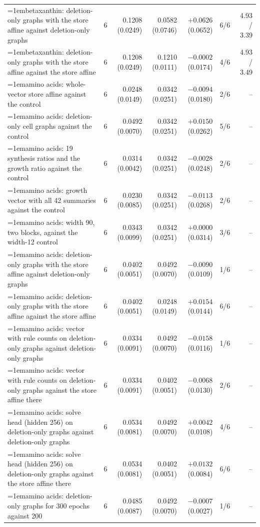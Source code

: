 \begin{table}[H]
\begin{tabular}{@{}>{\raggedright\hangindent=1em\hangafter=1\arraybackslash}p{78.5mm}rrrrrr@{}}
    betaxanthin: deletion-only graphs with the store affine against deletion-only graphs & 6 & 0.1208 (0.0249) & 0.0582 (0.0746) & $+0.0626$ (0.0652) & 6/6 & 4.93 / 3.39 \\
    betaxanthin: deletion-only graphs with the store affine against the store affine & 6 & 0.1208 (0.0249) & 0.1210 (0.0111) & $-0.0002$ (0.0174) & 4/6 & 4.93 / 3.49 \\
    amino acids: whole-vector store affine against the control & 6 & 0.0248 (0.0149) & 0.0342 (0.0251) & $-0.0094$ (0.0180) & 2/6 & -- \\
    amino acids: deletion-only cell graphs against the control & 6 & 0.0492 (0.0070) & 0.0342 (0.0251) & $+0.0150$ (0.0262) & 5/6 & -- \\
    amino acids: 19 synthesis ratios and the growth ratio against the control & 6 & 0.0314 (0.0042) & 0.0342 (0.0251) & $-0.0028$ (0.0248) & 2/6 & -- \\
    amino acids: growth vector with all 42 summaries against the control & 6 & 0.0230 (0.0085) & 0.0342 (0.0251) & $-0.0113$ (0.0268) & 2/6 & -- \\
    amino acids: width 90, two blocks, against the width-12 control & 6 & 0.0343 (0.0099) & 0.0342 (0.0251) & $+0.0000$ (0.0314) & 3/6 & -- \\
    amino acids: deletion-only graphs with the store affine against deletion-only graphs & 6 & 0.0402 (0.0051) & 0.0492 (0.0070) & $-0.0090$ (0.0109) & 1/6 & -- \\
    amino acids: deletion-only graphs with the store affine against the store affine & 6 & 0.0402 (0.0051) & 0.0248 (0.0149) & $+0.0154$ (0.0144) & 6/6 & -- \\
    amino acids: vector with rule counts on deletion-only graphs against deletion-only graphs & 6 & 0.0334 (0.0091) & 0.0492 (0.0070) & $-0.0158$ (0.0116) & 1/6 & -- \\
    amino acids: vector with rule counts on deletion-only graphs against the store affine there & 6 & 0.0334 (0.0091) & 0.0402 (0.0051) & $-0.0068$ (0.0130) & 2/6 & -- \\
    amino acids: solve head (hidden 256) on deletion-only graphs against deletion-only graphs & 6 & 0.0534 (0.0081) & 0.0492 (0.0070) & $+0.0042$ (0.0108) & 4/6 & -- \\
    amino acids: solve head (hidden 256) on deletion-only graphs against the store affine there & 6 & 0.0534 (0.0081) & 0.0402 (0.0051) & $+0.0132$ (0.0084) & 6/6 & -- \\
    amino acids: deletion-only graphs for 300 epochs against 200 & 6 & 0.0485 (0.0087) & 0.0492 (0.0070) & $-0.0007$ (0.0027) & 1/6 & -- \\
    \hline
  \end{tabular}
\end{table}

